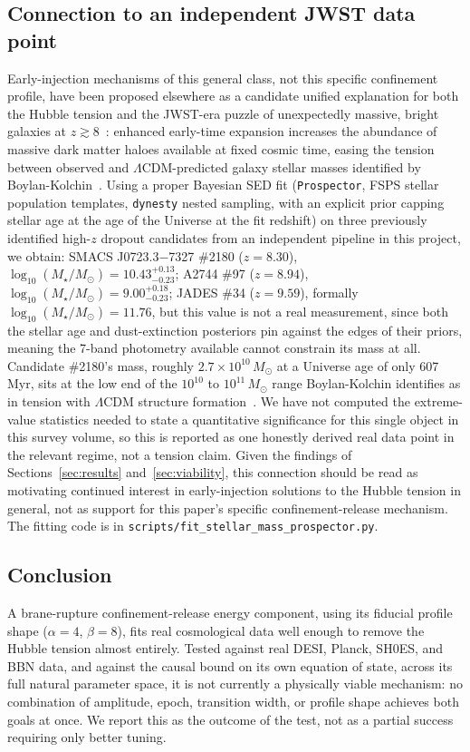 \documentclass[11pt,a4paper,twocolumn]{article}
\begin{document}
\subsection{Connection to an independent JWST data point}
Early-injection mechanisms of this general class, not this specific confinement profile, have been proposed elsewhere as a candidate unified explanation for both the Hubble tension and the JWST-era puzzle of unexpectedly massive, bright galaxies at $z \gtrsim 8$~\cite{shen2024}: enhanced early-time expansion increases the abundance of massive dark matter haloes available at fixed cosmic time, easing the tension between observed and $\Lambda$CDM-predicted galaxy stellar masses identified by Boylan-Kolchin~\cite{boylankolchin2023}. Using a proper Bayesian SED fit (\texttt{Prospector}, FSPS stellar population templates, \texttt{dynesty} nested sampling, with an explicit prior capping stellar age at the age of the Universe at the fit redshift) on three previously identified high-$z$ dropout candidates from an independent pipeline in this project, we obtain: SMACS J0723.3$-$7327 \#2180 ($z = 8.30$), $\log_{10}(M_\star/M_\odot) = 10.43^{+0.13}_{-0.23}$; A2744 \#97 ($z = 8.94$), $\log_{10}(M_\star/M_\odot) = 9.00^{+0.18}_{-0.23}$; JADES \#34 ($z = 9.59$), formally $\log_{10}(M_\star/M_\odot) = 11.76$, but this value is not a real measurement, since both the stellar age and dust-extinction posteriors pin against the edges of their priors, meaning the 7-band photometry available cannot constrain its mass at all. Candidate \#2180's mass, roughly $2.7\times10^{10}\,M_\odot$ at a Universe age of only 607 Myr, sits at the low end of the $10^{10}$ to $10^{11}\,M_\odot$ range Boylan-Kolchin identifies as in tension with $\Lambda$CDM structure formation~\cite{boylankolchin2023}. We have not computed the extreme-value statistics needed to state a quantitative significance for this single object in this survey volume, so this is reported as one honestly derived real data point in the relevant regime, not a tension claim. Given the findings of Sections~\ref{sec:results} and~\ref{sec:viability}, this connection should be read as motivating continued interest in early-injection solutions to the Hubble tension in general, not as support for this paper's specific confinement-release mechanism. The fitting code is in \texttt{scripts/fit\_stellar\_mass\_prospector.py}.

\subsection{Conclusion}
A brane-rupture confinement-release energy component, using its fiducial profile shape ($\alpha = 4$, $\beta = 8$), fits real cosmological data well enough to remove the Hubble tension almost entirely. Tested against real DESI, Planck, SH0ES, and BBN data, and against the causal bound on its own equation of state, across its full natural parameter space, it is not currently a physically viable mechanism: no combination of amplitude, epoch, transition width, or profile shape achieves both goals at once. We report this as the outcome of the test, not as a partial success requiring only better tuning.
\end{document}
